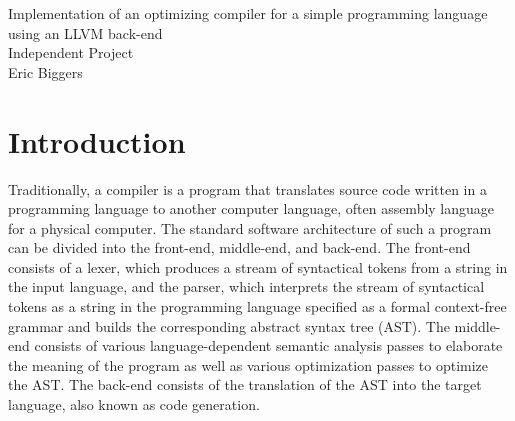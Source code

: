 \documentclass[11pt]{article}
\begin{document}
\begin{center}
{\LARGE Implementation of an optimizing compiler for a simple programming
language using an LLVM back-end} \\
\vspace{8mm}
{\Large Independent Project} \\
\vspace{4mm}
{\large Eric Biggers}
\end{center}
\vspace{5mm}

\begin{abstract}
    Designing a retargetable optimizing compiler is a very difficult task.
    Modern optimizing compilers such as GCC are extremely complex pieces of
    software that support hundreds of different optimizations and many different
    target architectures.  In contrast to the GCC project, the LLVM project
    attempts to encapsulate its compiler infrastructure in reusable libraries
    that can be used by external programs.
    Here I present a compiler for a toy
    programming language called ``garter'' which takes advantage of the LLVM
    infrastructure to implement an optimizing compiler which performs
    state-of-the-art optimizations on the generated code.  I also present an
    interpreter for garter that uses LLVM to perform just-in-time (JIT)
    compilation.
    In addition to showing the usefulness of LLVM, this project
    also serves as a demonstration of the construction of a compiler front-end.
\end{abstract}

\tableofcontents

\section{Introduction}

Traditionally, a compiler is a program that translates source code written in a
programming language to another computer language, often assembly language for a
physical computer.  The standard software architecture of such a program can be
divided into the front-end, middle-end, and back-end.  The front-end consists of
a lexer, which produces a stream of syntactical tokens from a string in the
input language, and the parser, which interprets the stream of syntactical
tokens as a string in the programming language specified as a formal
context-free grammar and builds the corresponding abstract syntax tree (AST).
The middle-end consists of various language-dependent semantic analysis passes
to elaborate the meaning of the program as well as various optimization passes
to optimize the AST.  The back-end consists of the translation of the AST into
the target language, also known as code generation.
\end{document}
